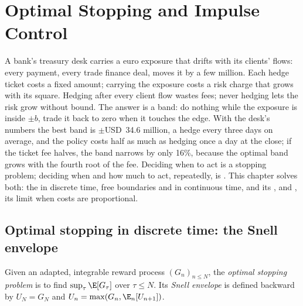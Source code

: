 \chapter{Optimal Stopping and Impulse Control}\label{ch:qm:optimal-stopping-and-impulse-control}

A bank's treasury desk carries a euro exposure that drifts with its clients' flows: every payment,
every trade finance deal, moves it by a few million. Each hedge ticket costs a fixed amount; carrying the
exposure costs a risk charge that grows with its square. Hedging after every client flow wastes fees;
never hedging lets the risk grow without bound. The answer is a band: do nothing while the exposure is
inside $\pm b$, trade it back to zero when it touches the edge. With the desk's numbers the best band is
$\pm$USD~34.6 million, a hedge every three days on average, and the policy costs half as much as hedging
once a day at the close; if the ticket fee halves, the band narrows by only 16\%, because the optimal band
grows with the fourth root of the fee. Deciding when to act is a stopping problem; deciding when and how
much to act, repeatedly, is . This chapter solves both: the  in discrete time,
free boundaries and  in continuous time,  and its , and
, its limit when costs are proportional.

\section{Optimal stopping in discrete time: the Snell envelope}

\begin{definition}\label{def:qm:optimal-stopping-and-impulse-control:snell}
Given an adapted, integrable reward process $(G_n)_{n\le N}$, the \emph{optimal stopping problem} is to find $\sup_\tau\E[G_\tau]$ over  $\tau \le N$. Its \emph{Snell envelope} is defined backward by $U_N = G_N$ and $U_n = \max(G_n, \E_n[U_{n+1}])$.
\end{definition}

